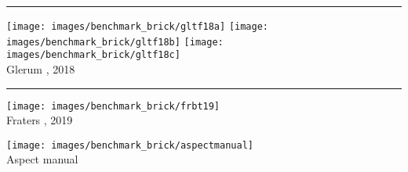 \begin{center}\noindent\rule{12cm}{0.4pt}\end{center}

\begin{center}
\texttt{[image: images/benchmark\_brick/gltf18a]}
\texttt{[image: images/benchmark\_brick/gltf18b]}
\texttt{[image: images/benchmark\_brick/gltf18c]}\\
{\captionfont Glerum \etal, 2018 \cite{gltf18}}
\end{center}

\begin{center}\noindent\rule{12cm}{0.4pt}\end{center}

\begin{center}
\begin{minipage}{0.45\textwidth}
\centering
\texttt{[image: images/benchmark\_brick/frbt19]}\\
{\captionfont Fraters \etal, 2019 \cite{frbt19}}
\end{minipage}\hfill
\begin{minipage}{0.45\textwidth}
\centering
\texttt{[image: images/benchmark\_brick/aspectmanual]}\\
{\captionfont Aspect manual \cite{aspectmanual}}
\end{minipage}
\end{center}
